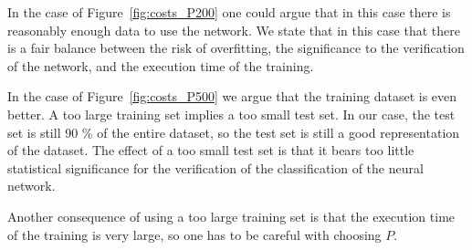 In the case of Figure~\ref{fig:costs_P200} one could argue that in this case there is reasonably enough data to use the network.
We state that in this case that there is a fair balance between the risk of overfitting, the significance to the verification of the network, and the execution time of the training.

In the case of Figure~\ref{fig:costs_P500} we argue that the training dataset is even better.
A too large training set implies a too small test set.
In our case, the test set is still 90 \% of the entire dataset, so the test set is still a good representation of the dataset.
The effect of a too small test set is that it bears too little statistical significance for the verification of the classification of the neural network.

Another consequence of using a too large training set is that the execution time of the training is very large, so one has to be careful with choosing \(P\).